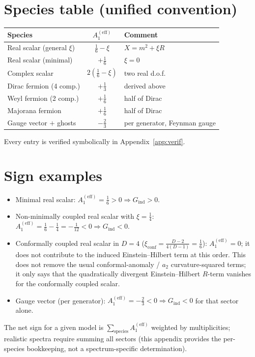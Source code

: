 \documentclass[11pt,a4paper]{article}
\newcommand{\Aeff}{A_1^{(\mathrm{eff})}}
\begin{document}
\section{Species table (unified convention)}
\begin{center}
\begin{tabular}{lcl}
\toprule
Species & $\Aeff$ & Comment\\
\midrule
Real scalar (general $\xi$) & $\tfrac16 - \xi$ & $X = m^2 + \xi R$\\
Real scalar (minimal) & $+\tfrac16$ & $\xi = 0$\\
Complex scalar & $2(\tfrac16 - \xi)$ & two real d.o.f.\\
Dirac fermion (4 comp.) & $+\tfrac13$ & derived above\\
Weyl fermion (2 comp.) & $+\tfrac16$ & half of Dirac\\
Majorana fermion & $+\tfrac16$ & half of Dirac\\
Gauge vector ${+}$ ghosts & $-\tfrac23$ & per generator, Feynman gauge\\
\bottomrule
\end{tabular}
\end{center}
Every entry is verified symbolically in Appendix~\ref{app:verif}.

\section{Sign examples}
\begin{itemize}
\item Minimal real scalar: $\Aeff = \tfrac16 > 0 \Rightarrow G_{\mathrm{ind}} >
0$.
\item Non-minimally coupled real scalar with $\xi = \tfrac14$: $\Aeff =
\tfrac16 - \tfrac14 = -\tfrac{1}{12} < 0 \Rightarrow G_{\mathrm{ind}} < 0$.
\item Conformally coupled real scalar in $D=4$ ($\xi_{\mathrm{conf}} =
\tfrac{D-2}{4(D-1)} = \tfrac16$): $\Aeff = 0$; it does not contribute to the
induced Einstein--Hilbert term at this order. This does not remove the usual
conformal-anomaly / $a_2$ curvature-squared terms; it only says that the
quadratically divergent Einstein--Hilbert $R$-term vanishes for the
conformally coupled scalar.
\item Gauge vector (per generator): $\Aeff = -\tfrac23 < 0 \Rightarrow
G_{\mathrm{ind}} < 0$ for that sector alone.
\end{itemize}
The net sign for a given model is $\sum_{\mathrm{species}} \Aeff$ weighted by
multiplicities; realistic spectra require summing all sectors (this appendix
provides the per-species bookkeeping, not a spectrum-specific determination).
\end{document}
